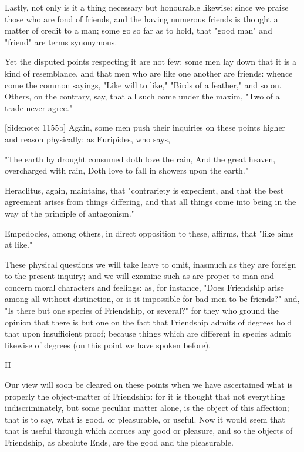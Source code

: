 Lastly, not only is it a thing necessary but honourable likewise: since
we praise those who are fond of friends, and the having numerous friends
is thought a matter of credit to a man; some go so far as to hold, that
"good man" and "friend" are terms synonymous.

Yet the disputed points respecting it are not few: some men lay down
that it is a kind of resemblance, and that men who are like one another
are friends: whence come the common sayings, "Like will to like," "Birds
of a feather," and so on. Others, on the contrary, say, that all such
come under the maxim, "Two of a trade never agree."

[Sidenote: 1155b] Again, some men push their inquiries on these points
higher and reason physically: as Euripides, who says,

  "The earth by drought consumed doth love the rain,
  And the great heaven, overcharged with rain,
  Doth love to fall in showers upon the earth."

Heraclitus, again, maintains, that "contrariety is expedient, and that
the best agreement arises from things differing, and that all things
come into being in the way of the principle of antagonism."

Empedocles, among others, in direct opposition to these, affirms, that
"like aims at like."

These physical questions we will take leave to omit, inasmuch as they
are foreign to the present inquiry; and we will examine such as are
proper to man and concern moral characters and feelings: as, for
instance, "Does Friendship arise among all without distinction, or is it
impossible for bad men to be friends?" and, "Is there but one species of
Friendship, or several?" for they who ground the opinion that there is
but one on the fact that Friendship admits of degrees hold that upon
insufficient proof; because things which are different in species admit
likewise of degrees (on this point we have spoken before).


II

Our view will soon be cleared on these points when we have ascertained
what is properly the object-matter of Friendship: for it is thought that
not everything indiscriminately, but some peculiar matter alone, is the
object of this affection; that is to say, what is good, or pleasurable,
or useful. Now it would seem that that is useful through which accrues
any good or pleasure, and so the objects of Friendship, as absolute
Ends, are the good and the pleasurable.

